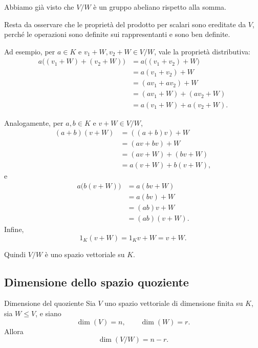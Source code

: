 \documentclass[a4paper]{article}
\begin{document}
\begin{radioactive}
\begin{snippetproof}{}
    Abbiamo già visto che \(V/W\) è un gruppo abeliano rispetto alla somma.

    Resta da osservare che le proprietà del prodotto per scalari sono ereditate da \(V\), perché le operazioni sono definite sui rappresentanti e sono ben definite.

    Ad esempio, per \(a \in K\) e \(v_1+W,v_2+W \in V/W\), vale la proprietà distributiva:
    \begin{align*}
        a\big((v_1+W)+(v_2+W)\big)
        &=
        a\big((v_1+v_2)+W\big) \\
        &=
        a(v_1+v_2)+W \\
        &=
        (av_1+av_2)+W \\
        &=
        (av_1+W)+(av_2+W) \\
        &=
        a(v_1+W)+a(v_2+W).
    \end{align*}

    Analogamente, per \(a,b \in K\) e \(v+W \in V/W\),
    \begin{align*}
        (a+b)(v+W)
        &=
        ((a+b)v)+W \\
        &=
        (av+bv)+W \\
        &=
        (av+W)+(bv+W) \\
        &=
        a(v+W)+b(v+W),
    \end{align*}
    e
    \begin{align*}
        a\big(b(v+W)\big)
        &=
        a(bv+W) \\
        &=
        a(bv)+W \\
        &=
        (ab)v+W \\
        &=
        (ab)(v+W).
    \end{align*}
    Infine,
    \[
        1_K(v+W)
        =
        1_Kv+W
        =
        v+W.
    \]

    Quindi \(V/W\) è uno spazio vettoriale su \(K\).
\end{snippetproof}
\end{radioactive}

\subsection{Dimensione dello spazio quoziente}

\begin{radioactive}
\begin{snippetproposition}{Dimensione del quoziente}
    Sia \(V\) uno spazio vettoriale di dimensione finita su \(K\), sia \(W \leq V\), e siano
    \[
        \dim(V)=n,
        \qquad
        \dim(W)=r.
    \]
    Allora
    \[
        \dim(V/W)=n-r.
    \]
\end{snippetproposition}
\end{radioactive}
\end{document}
